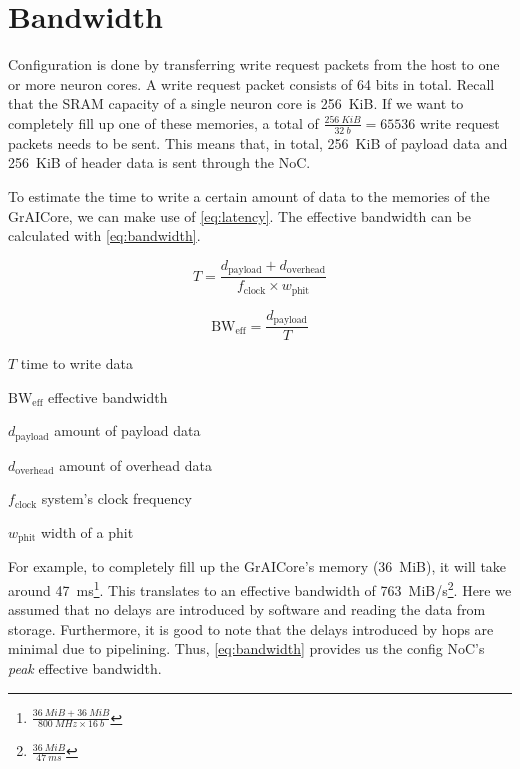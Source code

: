\section{Bandwidth}
Configuration is done by transferring write request packets from the host to one or more neuron cores.
A write request packet consists of 64 bits in total.
Recall that the SRAM capacity of a single neuron core is \SI{256}{KiB}.
If we want to completely fill up one of these memories, a total of $\frac{\SI{256}{KiB}}{\SI{32}{b}} = 65536$ write request packets needs to be sent.
This means that, in total, \SI{256}{KiB} of payload data and \SI{256}{KiB} of header data is sent through the NoC.

To estimate the time to write a certain amount of data to the memories of the GrAICore, we can make use of \cref{eq:latency}.
The effective bandwidth can be calculated with \cref{eq:bandwidth}.

\begin{equation}
    T = 
    \frac{d_{\text{payload}} + d_{\text{overhead}}}
    {f_{\text{clock}} \times w_{\text{phit}}}
\label{eq:latency}
\end{equation}

\begin{equation}
    \text{BW}_{\text{eff}} =
    \frac{d_\text{payload}}{T}
\label{eq:bandwidth}
\end{equation}

\begin{eqexpl}[15mm]
    \item{$T$} time to write data
    \item{$\text{BW}_{\text{eff}}$} effective bandwidth
    \item{$d_{\text{payload}}$} amount of payload data
    \item{$d_{\text{overhead}}$} amount of overhead data
    \item{$f_{\text{clock}}$} system's clock frequency
    \item{$w_{\text{phit}}$} width of a phit
\end{eqexpl}

For example, to completely fill up the GrAICore's memory (\SI{36}{MiB}), it will take around \SI{47}{ms}\footnote{$\frac{\SI{36}{MiB} + \SI{36}{MiB}}{\SI{800}{MHz} \times \SI{16}{b}}$}.
This translates to an effective bandwidth of \SI{763}{MiB/s}\footnote{$\frac{\SI{36}{MiB}}{\SI{47}{ms}}$}.
Here we assumed that no delays are introduced by software and reading the data from storage.
Furthermore, it is good to note that the delays introduced by hops are minimal due to pipelining.
Thus, \cref{eq:bandwidth} provides us the config NoC's \textit{peak} effective bandwidth.
